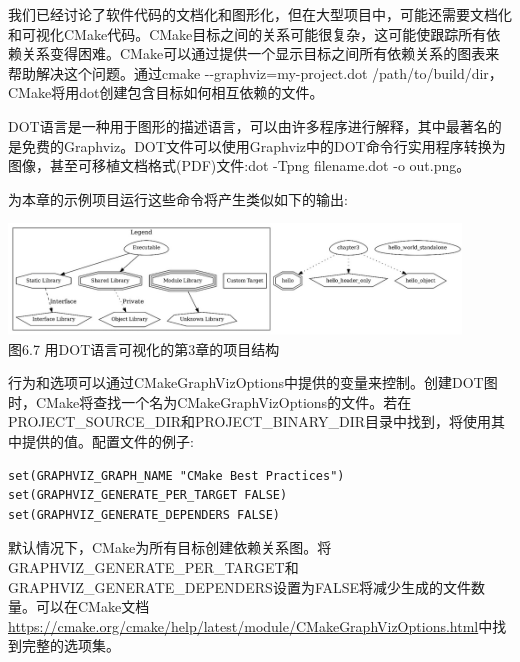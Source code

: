 

我们已经讨论了软件代码的文档化和图形化，但在大型项目中，可能还需要文档化和可视化CMake代码。CMake目标之间的关系可能很复杂，这可能使跟踪所有依赖关系变得困难。CMake可以通过提供一个显示目标之间所有依赖关系的图表来帮助解决这个问题。通过cmake -{}-graphviz=my-project.dot /path/to/build/dir，CMake将用dot创建包含目标如何相互依赖的文件。

DOT语言是一种用于图形的描述语言，可以由许多程序进行解释，其中最著名的是免费的Graphviz。DOT文件可以使用Graphviz中的DOT命令行实用程序转换为图像，甚至可移植文档格式(PDF)文件:dot -Tpng filename.dot -o out.png。

为本章的示例项目运行这些命令将产生类似如下的输出:

\begin{center}
\includegraphics[width=0.9\textwidth]{content/2/chapter6/images/7.jpg}\\
图6.7 用DOT语言可视化的第3章的项目结构
\end{center}

行为和选项可以通过CMakeGraphVizOptions中提供的变量来控制。创建DOT图时，CMake将查找一个名为CMakeGraphVizOptions的文件。若在PROJECT\_SOURCE\_DIR和PROJECT\_BINARY\_DIR目录中找到，将使用其中提供的值。配置文件的例子:

\begin{lstlisting}[style=styleCMake]
set(GRAPHVIZ_GRAPH_NAME "CMake Best Practices")
set(GRAPHVIZ_GENERATE_PER_TARGET FALSE)
set(GRAPHVIZ_GENERATE_DEPENDERS FALSE)
\end{lstlisting}

默认情况下，CMake为所有目标创建依赖关系图。将GRAPHVIZ\_GENERATE\_PER\_TARGET和GRAPHVIZ\_GENERATE\_DEPENDERS设置为FALSE将减少生成的文件数量。可以在CMake文档\url{https://cmake.org/cmake/help/latest/module/CMakeGraphVizOptions.html}中找到完整的选项集。

















